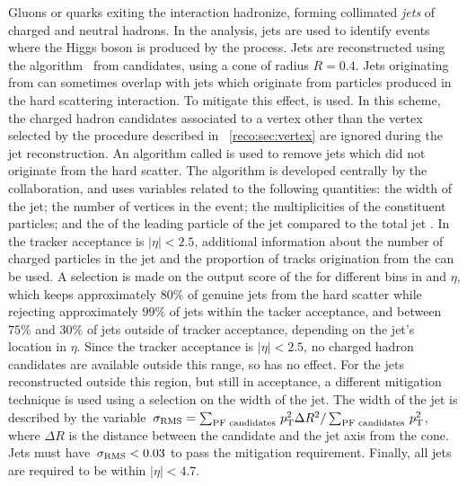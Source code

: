 Gluons or quarks exiting the \pp interaction hadronize, forming collimated \emph{jets} of charged and neutral hadrons.
In the \Hgg analysis, jets are used to identify events where the Higgs boson is produced by the \VBF process. 
Jets are reconstructed using the \antiKt algorithm~\cite{antiKt} from \PF candidates, using a cone of radius $R=0.4$. Jets originating from \PU can sometimes overlap with jets which originate from particles produced in the hard scattering interaction. To mitigate this effect, \PFCHS is used. In this scheme, the \PF charged hadron candidates associated to a vertex other than the vertex selected by the procedure described in \Sec~\ref{reco:sec:vertex} are ignored during the jet reconstruction. %
\ifNewAnalysis
An algorithm called \PUJID is used to remove jets which did not originate from the hard scatter. The algorithm is developed centrally by the \CMS collaboration, and uses variables related to the following quantities: the width of the jet; the number of vertices in the event; the multiplicities of the constituent particles; and the \pT of the leading particle of the jet compared to the total jet \pT. In the tracker acceptance is $|\eta|<2.5$, additional information about the number of charged particles in the jet and the proportion of tracks origination from the \PV can be used. A selection is made on the output score of the \PUJID for different bins in \pT and $\eta$, which keeps approximately $80\%$ of genuine jets from the hard scatter while rejecting approximately $99\%$ of \PU jets within the tacker acceptance, and between $75\%$ and $30\%$ of \PU jets outside of tracker acceptance, depending on the jet's location in $\eta$.
\else
Since the tracker acceptance is $|\eta|<2.5$, no \PF charged hadron candidates are available outside this range, so \PFCHS has no effect. For the jets reconstructed outside this region, but still in acceptance, a different \PU mitigation technique is used using a selection on the width of the jet. 
The width of the jet is described by the variable $\,\sigma_{\text{RMS}}= \sum_{\text{PF candidates}}\,p_\text{T}^2 \Delta R^2/ \sum_{\text{PF candidates}}\,p_\text{T}^2 $, where $\Delta R$ is the distance between the \PF candidate and the jet axis from the cone. Jets must have $\,\sigma_{\text{RMS}}<0.03$ to pass the \PU mitigation requirement. 
\fi
Finally, all jets are required to be within $|\eta|<4.7$.

